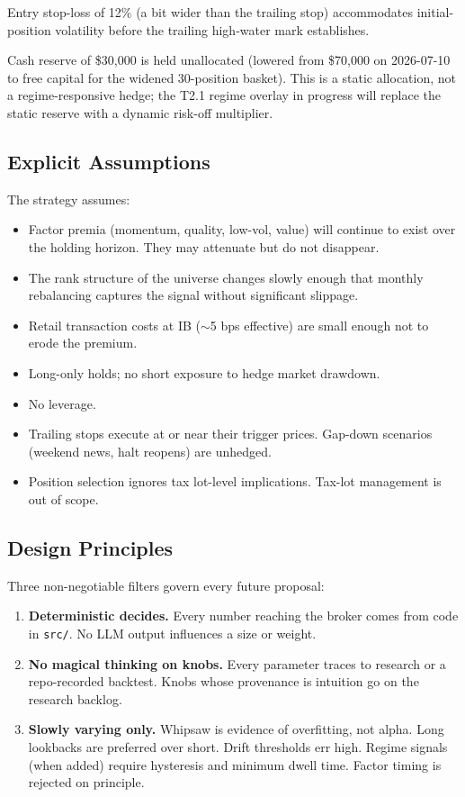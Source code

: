 \documentclass[11pt,a4paper]{article}
\begin{document}
Entry stop-loss of 12\% (a bit wider than the trailing stop) accommodates initial-position volatility before the trailing high-water mark establishes.

Cash reserve of \$30{,}000 is held unallocated (lowered from \$70{,}000 on 2026-07-10 to free capital for the widened 30-position basket). This is a static allocation, not a regime-responsive hedge; the T2.1 regime overlay in progress will replace the static reserve with a dynamic risk-off multiplier.

\subsection{Explicit Assumptions}

The strategy assumes:

\begin{itemize}[noitemsep]
    \item Factor premia (momentum, quality, low-vol, value) will continue to exist over the holding horizon. They may attenuate but do not disappear.
    \item The rank structure of the universe changes slowly enough that monthly rebalancing captures the signal without significant slippage.
    \item Retail transaction costs at IB ($\sim$5 bps effective) are small enough not to erode the premium.
    \item Long-only holds; no short exposure to hedge market drawdown.
    \item No leverage.
    \item Trailing stops execute at or near their trigger prices. Gap-down scenarios (weekend news, halt reopens) are unhedged.
    \item Position selection ignores tax lot-level implications. Tax-lot management is out of scope.
\end{itemize}

\subsection{Design Principles}
\label{sec:principles}

Three non-negotiable filters govern every future proposal:

\begin{enumerate}[noitemsep]
    \item \textbf{Deterministic decides.} Every number reaching the broker comes from code in \texttt{src/}. No LLM output influences a size or weight.
    \item \textbf{No magical thinking on knobs.} Every parameter traces to research or a repo-recorded backtest. Knobs whose provenance is intuition go on the research backlog.
    \item \textbf{Slowly varying only.} Whipsaw is evidence of overfitting, not alpha. Long lookbacks are preferred over short. Drift thresholds err high. Regime signals (when added) require hysteresis and minimum dwell time. Factor timing is rejected on principle.
\end{enumerate}
\end{document}
